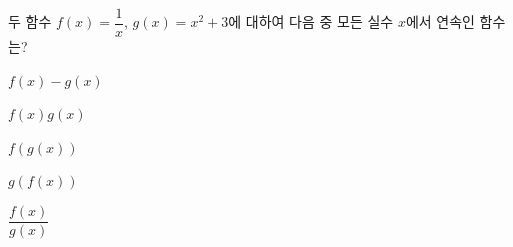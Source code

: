 두 함수 $f(x)=\dfrac{1}{x}$, $g(x)=x^2+3$에 대하여 다음 중 모든 실수 $x$에서 연속인 함수는?
\begin{choicesii}{\rule[-3ex]{0pt}{8ex}$f(x)-g(x)$}{\rule[-3ex]{0pt}{8ex}$f(x)g(x)$}{\rule[-3ex]{0pt}{8ex}$f(g(x))$}{\rule[-3ex]{0pt}{8ex}$g(f(x))$}{\rule[-3ex]{0pt}{8ex}$\dfrac{f(x)}{g(x)}$}\end{choicesii}
